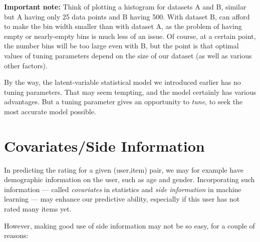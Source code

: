 \textbf{Important note:} Think of plotting a histogram for datasets A
and B, similar but A having only 25 data points and B having 500.  With
dataset B, can afford to make the bin width smaller than with dataset A,
as the problem of having empty or nearly-empty bins is much less of an
issue.  Of course, at a certain point, the number bins will be too large
even with B, but the point is that optimal values of tuning parameters
depend on the size of our dataset (as well as various other factors).

By the way, the latent-variable statistical model we introduced earlier
has no tuning parameters.  That may seem tempting, and the model
certainly has various advantages.  But a tuning parameter gives an
opportunity to \textit{tune}, to seek the most accurate model possible.

\section{Covariates/Side Information}

In predicting the rating for a given (user,item) pair, we may for
example have demographic information on the user, such as age and
gender.  Incorporating such information --- called \textit{covariates}
in statistics and \textit{side information} in machine learning --- may
enhance our predictive ability, especially if this user has not rated
many items yet.

However, making good use of side information may not be so easy, for a
couple of reasons:

